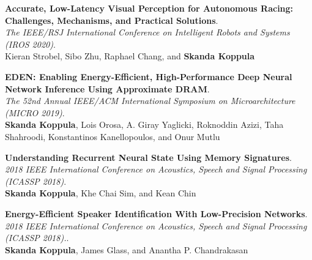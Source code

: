 \documentclass[letterpaper,11pt]{article}
\begin{document}
\vspace{0.1in}

\textbf{Accurate, Low-Latency Visual Perception for Autonomous Racing: Challenges, Mechanisms, and Practical Solutions}. \\
\textit{The IEEE/RSJ International Conference on Intelligent Robots and Systems (IROS 2020)}. \\
Kieran Strobel, Sibo Zhu, Raphael Chang, and \textbf{Skanda Koppula}

\vspace{0.1in}

\textbf{EDEN: Enabling Energy-Efficient, High-Performance Deep Neural Network Inference Using Approximate DRAM}. \\
\textit{The 52nd Annual IEEE/ACM International Symposium on Microarchitecture (MICRO 2019)}. \\
\textbf{Skanda Koppula}, Lois Orosa, A. Giray Yaglicki, Roknoddin Azizi, Taha Shahroodi, Konstantinos Kanellopoulos, and Onur Mutlu

\vspace{0.1in}

\textbf{Understanding Recurrent Neural State Using Memory Signatures}. \\
\textit{2018 IEEE International Conference on Acoustics, Speech and Signal Processing (ICASSP 2018)}. \\
\textbf{Skanda Koppula}, Khe Chai Sim, and Kean Chin

\vspace{0.1in}

\textbf{Energy-Efficient Speaker Identification With Low-Precision Networks}. \\
\textit{2018 IEEE International Conference on Acoustics, Speech and Signal Processing (ICASSP 2018).}. \\
\textbf{Skanda Koppula}, James Glass, and Anantha P. Chandrakasan
\end{document}

